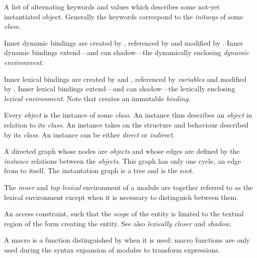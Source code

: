 \begin{optDefinition}
\begin{definitions}
      A list of alternating
    keywords and values which describes some not-yet instantiated object.
    Generally the keywords correspond to the {\em initargs} of some {\em class}.

     Inner dynamic
    bindings are created by , referenced by
     and modified by .  Inner
    dynamic bindings extend---and can shadow---the dynamically enclosing {\em
        dynamic environment}.

     Inner lexical
    bindings are created by  and ,
    referenced by {\em variables} and modified by .  Inner
    lexical bindings extend---and can shadow---the lexically enclosing {\em
        lexical environment}.  Note that  creates an
    immutable {\em binding}.

      Every {\em object} is the
    instance of some {\em class}.  An instance thus describes an {\em object} in
    relation to its {\em class}.  An instance takes on the structure and
    behaviour described by its {\em class}.  An instance can be either {\em
        direct} or {\em indirect}.

      A
    directed graph whose nodes are {\em objects} and whose edges are defined by
    the {\em instance} relations between the {\em objects}.  This graph has only
    one cycle, an edge from  to itself.  The instantation graph
    is a tree and  is the root.

     The
    {\em inner} and {\em top lexical} environment of a module are together
    referred to as the lexical environment except when it is necessary to
    distinguish between them.

     An access
    constraint, such that the {\em scope} of the entity is limited to the
    textual region of the form creating the entity.  See also {\em lexically
        closer} and {\em shadow}.

     A macro is a function distinguished
    by when it is used: macro functions are only used during the syntax
    expansion of modules to transform expressions.


\end{definitions}
\end{optDefinition}
